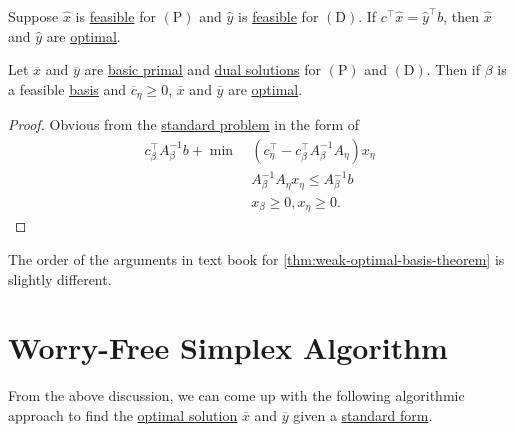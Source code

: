 \begin{corollary}\label{col:lec7-1}
	Suppose \(\hat{x}\) is \hyperref[def:feasible-solution]{feasible} for \((\mathrm{P})\) and \(\hat{y}\) is \hyperref[def:feasible-solution]{feasible} for \((\mathrm{D})\). If
	\(c^{\top}\hat{x} = \hat{y}^{\top} b\), then \(\hat{x}\) and \(\hat{y}\) are \hyperref[def:optimal-solution]{optimal}.
\end{corollary}

\begin{theorem}\label{thm:weak-optimal-basis-theorem}
	Let \(\overline{x}\) and \(\overline{y}\) are \hyperref[def:basic-solution]{basic primal} and \hyperref[def:dual-basic-solution]{dual solutions} for \((\mathrm{P})\) and \((\mathrm{D})\).
	Then if \(\beta\) is a feasible \hyperref[def:basis]{basis} and \(\overline{c}_{\eta}\geq 0\), \(\overline{x}\) and \(\overline{y}\) are \hyperref[def:optimal-solution]{optimal}.
\end{theorem}
\begin{proof}
	Obvious from the \hyperref[def:standard-form]{standard problem} in the form of
	\[
		\begin{aligned}
			c^{\top}_{\beta}A^{-1}_{\beta}b + \min~ & (c_{\eta}^{\top} - c_{\beta}^{\top}A^{-1}_{\beta}A_{\eta})x_{\eta} \\
			                                        & A^{-1}_{\beta}A_{\eta}x_{\eta} \leq A^{-1}_{\beta}b                \\
			                                        & x_{\beta}\geq 0, x_{\eta}\geq 0.
		\end{aligned}
	\]
\end{proof}

\begin{note}
	The order of the arguments in text book for \autoref{thm:weak-optimal-basis-theorem} is slightly different.
\end{note}

\section{Worry-Free Simplex Algorithm}
From the above discussion, we can come up with the following algorithmic approach to find the \hyperref[def:optimal-solution]{optimal solution} \(\overline{x} \) and \(\overline{y} \) given a \hyperref[def:standard-form]{standard form}.

